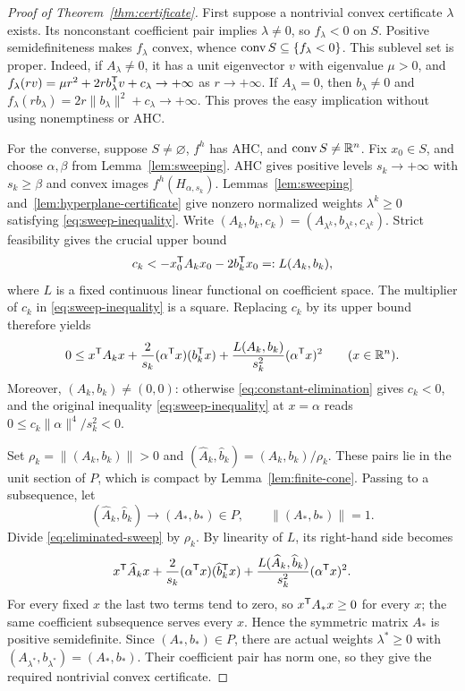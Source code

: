 \begin{proof}[Proof of Theorem~\ref{thm:certificate}]
First suppose a nontrivial convex certificate $\lambda$ exists.
Its nonconstant coefficient pair implies $\lambda\ne0$, so
$f_\lambda<0$ on $S$. Positive semidefiniteness makes $f_\lambda$
convex, whence $\operatorname{conv} S\subseteq\{f_\lambda<0\}$.
This sublevel set is proper. Indeed, if $A_\lambda\ne0$, it has a
unit eigenvector $v$ with eigenvalue $\mu>0$, and
$f_\lambda(rv)=\mu r^2+2r b_\lambda^{\mathsf T} v+c_\lambda\to+\infty$
as $r\to+\infty$. If $A_\lambda=0$, then $b_\lambda\ne0$ and
$f_\lambda(r b_\lambda)=2r\|b_\lambda\|^2+c_\lambda\to+\infty$.
This proves the easy implication without using nonemptiness or AHC.

For the converse, suppose $S\ne\varnothing$, $f^h$ has AHC, and
$\operatorname{conv} S\ne\mathbb R^n$. Fix $x_0\in S$, and choose $\alpha,\beta$
from Lemma~\ref{lem:sweeping}. AHC gives positive levels
$s_k\to+\infty$ with $s_k\geq\beta$ and convex images
$f^h(H_{\alpha,s_k})$. Lemmas~\ref{lem:sweeping}
and~\ref{lem:hyperplane-certificate} give nonzero normalized
weights $\lambda^k\geq0$ satisfying \eqref{eq:sweep-inequality}.
Write $(A_k,b_k,c_k)=(A_{\lambda^k},b_{\lambda^k},c_{\lambda^k})$.
Strict feasibility gives the crucial upper bound
\begin{equation}\label{eq:constant-elimination}
 c_k<-x_0^{\mathsf T} A_kx_0-2b_k^{\mathsf T} x_0
       =:L(A_k,b_k),
\end{equation}
where $L$ is a fixed continuous linear functional on coefficient space.
The multiplier of $c_k$ in \eqref{eq:sweep-inequality} is a square.
Replacing $c_k$ by its upper bound therefore yields
\begin{equation}\label{eq:eliminated-sweep}
 0\leq x^{\mathsf T} A_kx
      +\frac{2}{s_k}(\alpha^{\mathsf T} x)(b_k^{\mathsf T} x)
      +\frac{L(A_k,b_k)}{s_k^2}(\alpha^{\mathsf T} x)^2
      \qquad(x\in\mathbb R^n).
\end{equation}
Moreover, $(A_k,b_k)\ne(0,0)$: otherwise \eqref{eq:constant-elimination}
gives $c_k<0$, and the original inequality
\eqref{eq:sweep-inequality} at $x=\alpha$ reads
$0\leq c_k\|\alpha\|^4/s_k^2<0$.

Set $\rho_k=\|(A_k,b_k)\|>0$ and
$(\widehat A_k,\widehat b_k)=(A_k,b_k)/\rho_k$.
These pairs lie in the unit section of $P$, which is compact by
Lemma~\ref{lem:finite-cone}. Passing to a subsequence, let
\[
 (\widehat A_k,\widehat b_k)\longrightarrow(A_*,b_*)\in P,
 \qquad \|(A_*,b_*)\|=1.
\]
Divide \eqref{eq:eliminated-sweep} by $\rho_k$. By linearity of $L$,
its right-hand side becomes
\[
 x^{\mathsf T}\widehat A_kx
 +\frac{2}{s_k}(\alpha^{\mathsf T} x)(\widehat b_k^{\mathsf T} x)
 +\frac{L(\widehat A_k,\widehat b_k)}{s_k^2}(\alpha^{\mathsf T} x)^2.
\]
For every fixed $x$ the last two terms tend to zero, so
$x^{\mathsf T} A_*x\geq0$ for every $x$; the same coefficient subsequence
serves every $x$. Hence the symmetric matrix $A_*$ is positive
semidefinite.
Since $(A_*,b_*)\in P$, there are actual weights $\lambda^*\geq0$
with $(A_{\lambda^*},b_{\lambda^*})=(A_*,b_*)$.
Their coefficient pair has norm one, so they give the required
nontrivial convex certificate.
\end{proof}

